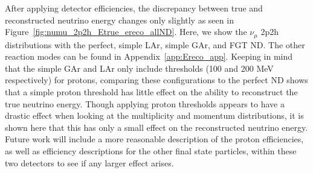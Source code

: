 \documentclass[12pt]{article}
\begin{document}
After applying detector efficiencies, the discrepancy between true and reconstructed neutrino energy changes only slightly as seen in Figure~\ref{fig:numu_2p2h_Etrue_ereco_allND}. Here, we show the $\nu_\mu$ 2p2h distributions with the perfect, simple LAr, simple GAr, and FGT ND. The other reaction modes can be found in Appendix~\ref{app:Ereco_app}. Keeping in mind that the simple GAr and LAr only include thresholds (100 and 200 MeV respectively) for protons, comparing these configurations to the perfect ND shows that a simple proton threshold has little effect on the ability to reconstruct the true neutrino energy. Though applying proton thresholds appears to have a drastic effect when looking at the multiplicity and momentum distributions, it is shown here that this has only a small effect on the reconstructed neutrino energy. Future work will include a more reasonable description of the proton efficiencies, as well as efficiency descriptions for the other final state particles, within these two detectors to see if any larger effect arises.
\end{document}

